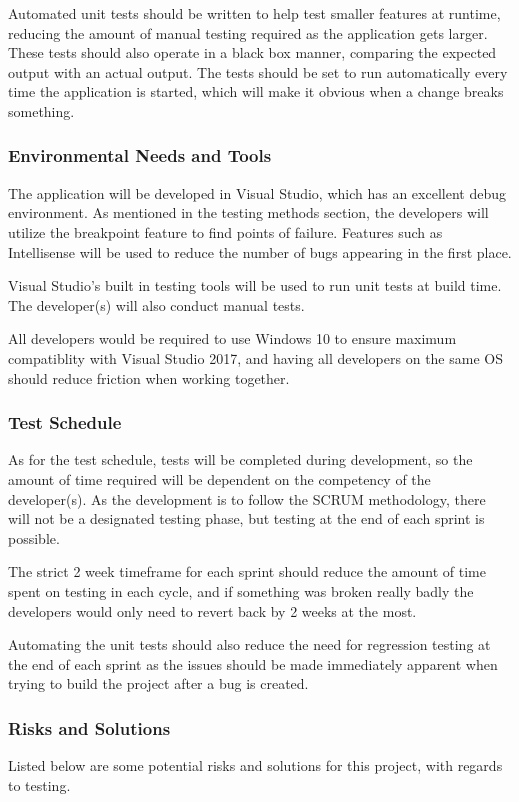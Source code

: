 \documentclass[a4paper]{article}
\begin{document}
Automated unit tests should be written to help test smaller features at runtime, reducing the amount of manual testing required as the application gets larger. These tests should also operate in a black box manner, comparing the expected output with an actual output. The tests should be set to run automatically every time the application is started, which will make it obvious when a change breaks something.

\subsubsection{Environmental Needs and Tools}
The application will be developed in Visual Studio, which has an excellent debug environment. As mentioned in the testing methods section, the developers will utilize the breakpoint feature to find points of failure. Features such as Intellisense will be used to reduce the number of bugs appearing in the first place.

Visual Studio's built in testing tools will be used to run unit tests at build time. The developer(s) will also conduct manual tests.

All developers would be required to use Windows 10 to ensure maximum compatiblity with Visual Studio 2017, and having all developers on the same OS should reduce friction when working together.

\subsubsection{Test Schedule}
As for the test schedule, tests will be completed during development, so the amount of time required will be dependent on the competency of the developer(s). As the development is to follow the SCRUM methodology, there will not be a designated testing phase, but testing at the end of each sprint is possible.

The strict 2 week timeframe for each sprint should reduce the amount of time spent on testing in each cycle, and if something was broken really badly the developers would only need to revert back by 2 weeks at the most.

Automating the unit tests should also reduce the need for regression testing at the end of each sprint as the issues should be made immediately apparent when trying to build the project after a bug is created.

\subsubsection{Risks and Solutions}
Listed below are some potential risks and solutions for this project, with regards to testing.
\end{document}
